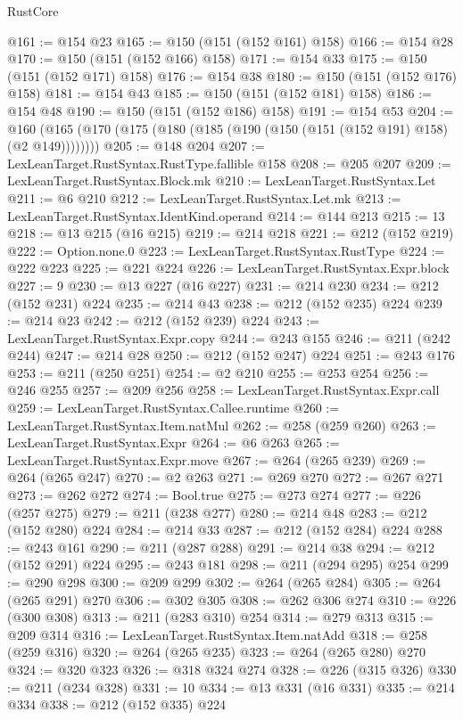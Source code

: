 \begin{lexlean}{RustCore}
\begin{coremodule}
@161 := @154 @23
@165 := @150 (@151 (@152 @161) @158)
@166 := @154 @28
@170 := @150 (@151 (@152 @166) @158)
@171 := @154 @33
@175 := @150 (@151 (@152 @171) @158)
@176 := @154 @38
@180 := @150 (@151 (@152 @176) @158)
@181 := @154 @43
@185 := @150 (@151 (@152 @181) @158)
@186 := @154 @48
@190 := @150 (@151 (@152 @186) @158)
@191 := @154 @53
@204 := @160 (@165 (@170 (@175 (@180 (@185 (@190 (@150 (@151 (@152 @191) @158) (@2 @149))))))))
@205 := @148 @204
@207 := LexLeanTarget.RustSyntax.RustType.fallible @158
@208 := @205 @207
@209 := LexLeanTarget.RustSyntax.Block.mk
@210 := LexLeanTarget.RustSyntax.Let
@211 := @6 @210
@212 := LexLeanTarget.RustSyntax.Let.mk
@213 := LexLeanTarget.RustSyntax.IdentKind.operand
@214 := @144 @213
@215 := 13
@218 := @13 @215 (@16 @215)
@219 := @214 @218
@221 := @212 (@152 @219)
@222 := Option.none.{0}
@223 := LexLeanTarget.RustSyntax.RustType
@224 := @222 @223
@225 := @221 @224
@226 := LexLeanTarget.RustSyntax.Expr.block
@227 := 9
@230 := @13 @227 (@16 @227)
@231 := @214 @230
@234 := @212 (@152 @231) @224
@235 := @214 @43
@238 := @212 (@152 @235) @224
@239 := @214 @23
@242 := @212 (@152 @239) @224
@243 := LexLeanTarget.RustSyntax.Expr.copy
@244 := @243 @155
@246 := @211 (@242 @244)
@247 := @214 @28
@250 := @212 (@152 @247) @224
@251 := @243 @176
@253 := @211 (@250 @251)
@254 := @2 @210
@255 := @253 @254
@256 := @246 @255
@257 := @209 @256
@258 := LexLeanTarget.RustSyntax.Expr.call
@259 := LexLeanTarget.RustSyntax.Callee.runtime
@260 := LexLeanTarget.RustSyntax.Item.natMul
@262 := @258 (@259 @260)
@263 := LexLeanTarget.RustSyntax.Expr
@264 := @6 @263
@265 := LexLeanTarget.RustSyntax.Expr.move
@267 := @264 (@265 @239)
@269 := @264 (@265 @247)
@270 := @2 @263
@271 := @269 @270
@272 := @267 @271
@273 := @262 @272
@274 := Bool.true
@275 := @273 @274
@277 := @226 (@257 @275)
@279 := @211 (@238 @277)
@280 := @214 @48
@283 := @212 (@152 @280) @224
@284 := @214 @33
@287 := @212 (@152 @284) @224
@288 := @243 @161
@290 := @211 (@287 @288)
@291 := @214 @38
@294 := @212 (@152 @291) @224
@295 := @243 @181
@298 := @211 (@294 @295) @254
@299 := @290 @298
@300 := @209 @299
@302 := @264 (@265 @284)
@305 := @264 (@265 @291) @270
@306 := @302 @305
@308 := @262 @306 @274
@310 := @226 (@300 @308)
@313 := @211 (@283 @310) @254
@314 := @279 @313
@315 := @209 @314
@316 := LexLeanTarget.RustSyntax.Item.natAdd
@318 := @258 (@259 @316)
@320 := @264 (@265 @235)
@323 := @264 (@265 @280) @270
@324 := @320 @323
@326 := @318 @324 @274
@328 := @226 (@315 @326)
@330 := @211 (@234 @328)
@331 := 10
@334 := @13 @331 (@16 @331)
@335 := @214 @334
@338 := @212 (@152 @335) @224

\end{coremodule}
\end{lexlean}
